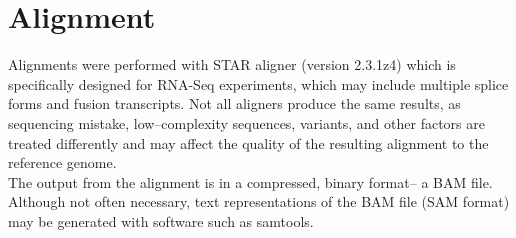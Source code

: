 \documentclass{article}
\begin{document}
{%

\section{Alignment}
Alignments were performed with STAR aligner  (version 2.3.1z4) \cite{star} which is specifically designed for RNA-Seq experiments, which may include multiple splice forms and fusion transcripts.  Not all aligners produce the same results, as sequencing mistake, low--complexity sequences, variants, and other factors are treated differently and may affect the quality of the resulting alignment to the reference genome.\\

The output from the alignment is in a compressed, binary format-- a BAM file.  Although not often necessary, text representations of the BAM file (SAM format) may be generated with software such as samtools.\\

}
\end{document}
